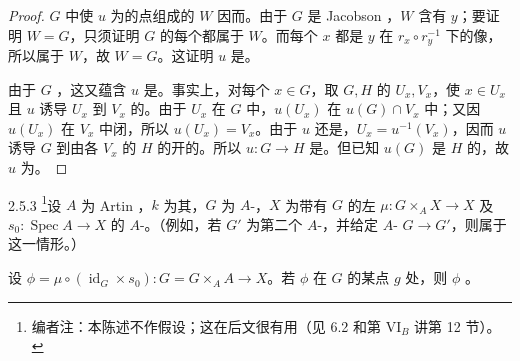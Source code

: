 \begin{proof}
$G$ 中使 $u$ 为的点组成的 $W$ 因而。由于 $G$ 是 Jacobson ，$W$ 含有 $y$；要证明 $W=G$，只须证明 $G$ 的每个都属于 $W$。而每个 $x$ 都是 $y$ 在 $r_x\circ r_y^{-1}$ 下的像，所以属于 $W$，故 $W=G$。这证明 $u$ 是。

由于 $G$ ，这又蕴含 $u$ 是。事实上，对每个 $x\in G$，取 $G,H$ 的 $U_x,V_x$，使 $x\in U_x$ 且 $u$ 诱导 $U_x$ 到 $V_x$ 的。由于 $U_x$ 在 $G$ 中，$u(U_x)$ 在 $u(G)\cap V_x$ 中；又因 $u(U_x)$ 在 $V_x$ 中闭，所以 $u(U_x)=V_x$。由于 $u$ 还是，$U_x=u^{-1}(V_x)$，因而 $u$ 诱导 $G$ 到由各 $V_x$ 的 $H$ 的开的。所以 $u:G\to H$ 是。但已知 $u(G)$ 是 $H$ 的，故 $u$ 为。
\end{proof}
\begin{SGAresult}{}{2.5.3}
\footnote{编者注：本陈述不作假设；这在后文很有用（见 6.2 和第 VI$_B$ 讲第 12 节）。}设 $A$ 为 Artin ，$k$ 为其，$G$ 为 $A$-，$X$ 为带有 $G$ 的左 $\mu:G\times_A X\to X$ 及 $s_0:\operatorname{Spec}A\to X$ 的 $A$-。（例如，若 $G'$ 为第二个 $A$-，并给定 $A$- $G\to G'$，则属于这一情形。）

设 $\phi=\mu\circ(\operatorname{id}_G\times s_0):G=G\times_A A\to X$。若 $\phi$ 在 $G$ 的某点 $g$ 处，则 $\phi$ 。
\end{SGAresult}
